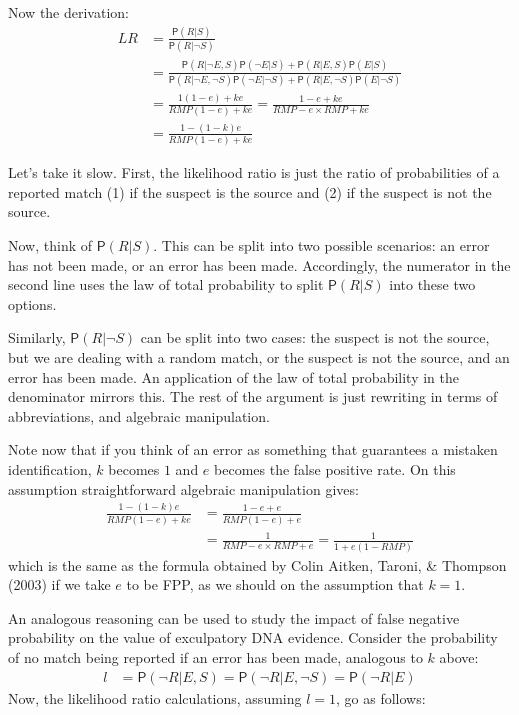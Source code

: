 \documentclass[
  10pt,
  dvipsnames,enabledeprecatedfontcommands]{scrartcl}
\newcommand{\n}{\neg}
\newcommand{\pr}[1]{\mathsf{P}(#1)}
\begin{document}
Now the derivation: \begin{align*}
LR & = \frac{\pr{R\vert S}}
{\pr{R \vert \n S}}\\
& = \frac{\pr{R \vert \n E, S}\pr{\n E \vert S} + \pr{R \vert E, S}\pr{E \vert S}}
{\pr{R \vert \n E, \n S}\pr {\n E \vert \n S} + \pr{R \vert E, \n S}\pr{E \vert \n S}}\\
& = \frac{1(1-e) + ke}
{RMP(1-e)+ke}  = \frac{1-e+ke}{RMP  - e\times RMP + ke} \\
& = \frac{1 - (1-k)e}{RMP(1-e)+ke}
\end{align*}

Let's take it slow. First, the likelihood ratio is just the ratio of
probabilities of a reported match (1) if the suspect is the source and
(2) if the suspect is not the source.

Now, think of \(\pr{R\vert S}\). This can be split into two possible
scenarios: an error has not been made, or an error has been made.
Accordingly, the numerator in the second line uses the law of total
probability to split \(\pr{R\vert S}\) into these two options.

Similarly, \(\pr{R\vert \n S}\) can be split into two cases: the suspect
is not the source, but we are dealing with a random match, or the
suspect is not the source, and an error has been made. An application of
the law of total probability in the denominator mirrors this. The rest
of the argument is just rewriting in terms of abbreviations, and
algebraic manipulation.

Note now that if you think of an error as something that guarantees a
mistaken identification, \(k\) becomes \(1\) and \(e\) becomes the false
positive rate. On this assumption straightforward algebraic manipulation
gives: \begin{align*}
 \frac{1 - (1-k)e}{RMP(1-e)+ke} & = \frac{1-e+e}{RMP(1-e)+e}\\
 & = \frac{1}{RMP - e\times RMP + e} = \frac{1}{1 + e(1-RMP)}
\end{align*} \noindent which is the same as the formula obtained by
Colin Aitken, Taroni, \& Thompson (2003) if we take \(e\) to be FPP, as
we should on the assumption that \(k=1\).

An analogous reasoning can be used to study the impact of false negative
probability on the value of exculpatory DNA evidence. Consider the
probability of no match being reported if an error has been made,
analogous to \(k\) above: \begin{align*}
l & = \pr{\n R \vert E, S} = \pr{\n R \vert E, \n S} = \pr{\n R\vert E}
\end{align*} \noindent Now, the likelihood ratio calculations, assuming
\(l = 1\), go as follows:
\end{document}
